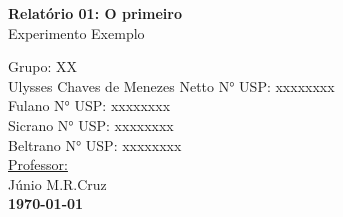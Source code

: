 \documentclass{article}
\begin{document}
\begin{titlepage}
\begin{center}
\begin{figure}[!ht]
			\end{figure}
			
			\vspace{200pt}
			
			\LARGE{\textbf{Relatório 01: O primeiro}}\\ %
			\Large{Experimento Exemplo}\\ %
			
			\vspace{150pt}
			
			\hfill Grupo: XX \\%
			
			\vspace{40pt} %
			\hfill Ulysses Chaves de Menezes Netto\hspace{20pt} N° USP: xxxxxxxx\\
			\hfill Fulano \hspace{20pt} N° USP: xxxxxxxx\\
			\hfill Sicrano \hspace{20pt} N° USP: xxxxxxxx\\
			\hfill Beltrano \hspace{20pt} N° USP: xxxxxxxx\\
			
			\vspace{25pt}
			\hfill \underline{Professor:}\\
			\hfill Júnio M.R.Cruz\\ %
			
			
			\vspace{\fill}
			\large\bf{\today}
			
		\end{center}
	\end{titlepage}
	
	
	\newpage
	
	\listoffigures %
	\newpage
	
	\pagestyle{fancy}
	\fancyhead[C]{}
	\fancyfoot[L]{}
	\fancyfoot[C]{\thepage}
	\fancyfoot[R]{}
	\renewcommand{\headrulewidth}{0.4pt}
	\renewcommand{\footrulewidth}{0.4pt}
	
\end{document}
